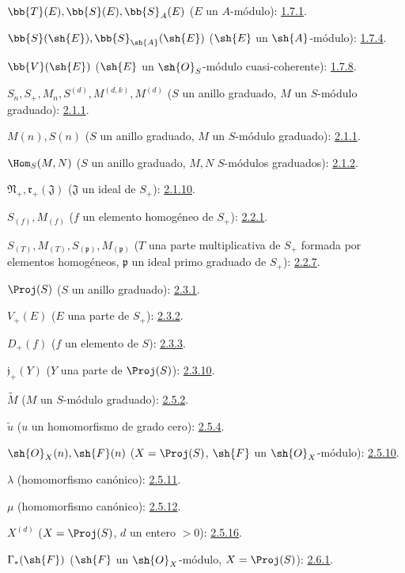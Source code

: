 \documentclass[oneside,10pt]{amsart}
\begin{document}
$\bb{T}(E),\bb{S}(E),\bb{S}_A(E)$ ($E$ un $A$-módulo): \hyperref[II.1.7.1]{1.7.1}.

$\bb{S}(\sh{E}),\bb{S}_{\sh{A}}(\sh{E})$
($\sh{E}$ un $\sh{A}$-módulo): \hyperref[II.1.7.4]{1.7.4}.

$\bb{V}(\sh{E})$ ($\sh{E}$ un $\sh{O}_S$-módulo cuasi-coherente): \hyperref[II.1.7.8]{1.7.8}.

$S_n,S_+,M_n,S^{(d)},M^{(d,k)},M^{(d)}$
($S$ un anillo graduado, $M$ un $S$-módulo graduado): \hyperref[II.2.1.1]{2.1.1}.

$M(n),S(n)$ ($S$ un anillo graduado, $M$ un $S$-módulo graduado): \hyperref[II.2.1.1]{2.1.1}.

$\Hom_S(M,N)$ ($S$ un anillo graduado, $M,N$ $S$-módulos graduados): \hyperref[II.2.1.2]{2.1.2}.

$\mathfrak N_+,\mathfrak r_+(\mathfrak J)$
($\mathfrak J$ un ideal de $S_+$): \hyperref[II.2.1.10]{2.1.10}.

$S_{(f)},M_{(f)}$ ($f$ un elemento homogéneo de $S_+$): \hyperref[II.2.2.1]{2.2.1}.

$S_{(T)},M_{(T)},S_{(\mathfrak p)},M_{(\mathfrak p)}$
($T$ una parte multiplicativa de $S_+$ formada por elementos homogéneos,
$\mathfrak p$ un ideal primo graduado de $S_+$): \hyperref[II.2.2.7]{2.2.7}.

$\Proj(S)$ ($S$ un anillo graduado): \hyperref[II.2.3.1]{2.3.1}.

$V_+(E)$ ($E$ una parte de $S_+$): \hyperref[II.2.3.2]{2.3.2}.

$D_+(f)$ ($f$ un elemento de $S$): \hyperref[II.2.3.3]{2.3.3}.

$\mathfrak j_+(Y)$ ($Y$ una parte de $\Proj(S)$): \hyperref[II.2.3.10]{2.3.10}.

$\widetilde M$ ($M$ un $S$-módulo graduado): \hyperref[II.2.5.2]{2.5.2}.

$\widetilde u$ ($u$ un homomorfismo de grado cero): \hyperref[II.2.5.4]{2.5.4}.

$\sh{O}_X(n),\sh{F}(n)$
($X=\Proj(S)$, $\sh{F}$ un $\sh{O}_X$-módulo): \hyperref[II.2.5.10]{2.5.10}.

$\lambda$ (homomorfismo canónico): \hyperref[II.2.5.11]{2.5.11}.

$\mu$ (homomorfismo canónico): \hyperref[II.2.5.12]{2.5.12}.

$X^{(d)}$ ($X=\Proj(S)$, $d$ un entero $>0$): \hyperref[II.2.5.16]{2.5.16}.

$\Gamma_*(\sh{F})$ ($\sh{F}$ un $\sh{O}_X$-módulo,
$X=\Proj(S)$): \hyperref[II.2.6.1]{2.6.1}.
\end{document}
